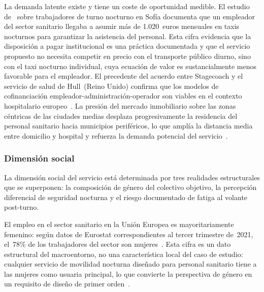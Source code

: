 La demanda latente existe y tiene un coste de oportunidad 
medible. El estudio de~\textcite{PlyushetvaBoussauw2020} 
sobre trabajadores de turno nocturno en Sofía documenta que 
un empleador del sector sanitario llegaba a asumir más de 
1.020~euros mensuales en taxis nocturnos para garantizar la 
asistencia del personal. Esta cifra evidencia que la 
disposición a pagar institucional es una práctica 
documentada y que el servicio propuesto no necesita competir 
en precio con el transporte público diurno, sino con el taxi 
nocturno individual, cuya ecuación de valor es 
sustancialmente menos favorable para el empleador. El 
precedente del acuerdo entre Stagecoach y el servicio de 
salud de Hull~(Reino Unido) confirma que los modelos de 
cofinanciación empleador-administración-operador son 
viables en el contexto hospitalario 
europeo~\parencite{Stagecoach2020Hull}. La presión del 
mercado inmobiliario sobre las zonas céntricas de las 
ciudades medias desplaza progresivamente la residencia del 
personal sanitario hacia municipios periféricos, lo que 
amplía la distancia media entre domicilio y hospital y 
refuerza la demanda potencial del 
servicio~\parencite{dAntonio2024}.



\subsubsection{Dimensión social}
\label{sec:pestel-social}

La dimensión social del servicio está determinada por tres 
realidades estructurales que se superponen: la composición de 
género del colectivo objetivo, la percepción diferencial de 
seguridad nocturna y el riesgo documentado de fatiga al volante 
post-turno.

El empleo en el sector sanitario en la Unión Europea es 
mayoritariamente femenino: según datos de Eurostat 
correspondientes al tercer trimestre de~2021, el~78\% de los 
trabajadores del sector son 
mujeres~\parencite{Eurostat2022health}. Esta cifra es un dato 
estructural del macroentorno, no una característica local del 
caso de estudio: cualquier servicio de movilidad nocturna 
diseñado para personal sanitario tiene a las mujeres como 
usuaria principal, lo que convierte la perspectiva de género 
en un requisito de diseño de primer 
orden~\parencite{Eurostat2020Health}.

